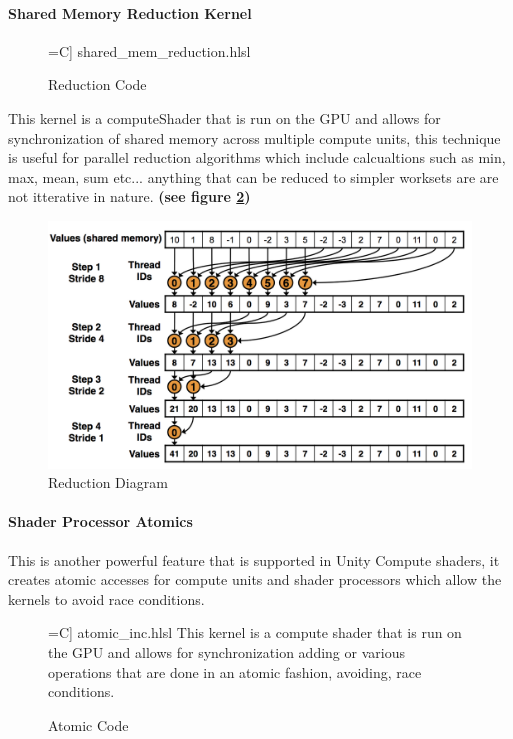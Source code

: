 \documentclass[a4paper,10pt]{article}
\begin{document}
\paragraph{Shared Memory Reduction Kernel}
\begin{figure}[H]
	\label{fig:reductionCode}
 =C] {shared_mem_reduction.hlsl}
\caption{Reduction Code}
\end{figure}

This kernel is a computeShader that is run on the GPU and allows for synchronization of shared memory across multiple compute units, this technique is useful for parallel reduction algorithms which include
calcualtions such as min, max, mean, sum etc... anything that can be reduced to simpler worksets are are not itterative in nature. \textbf{(see figure \ref{fig:reductionImg})}

\begin{figure}[H]
	\includegraphics[width=\linewidth,height=\paperheight,keepaspectratio]{reduction.jpg}
	\caption{Reduction Diagram}
	\label{fig:reductionImg}
	\end{figure}
\paragraph{Shader Processor Atomics} 
This is another powerful feature that is supported in Unity Compute shaders, it creates atomic accesses for compute units and shader processors which allow the kernels to avoid race conditions. 
\begin{figure}[H]
 =C] {atomic_inc.hlsl}
This kernel is a compute shader that is run on the GPU and allows for synchronization adding or various operations that are done in an atomic fashion, avoiding, race conditions.
\caption{Atomic Code}
\label{fig:atomicCode}
\end{figure}
\end{document}
